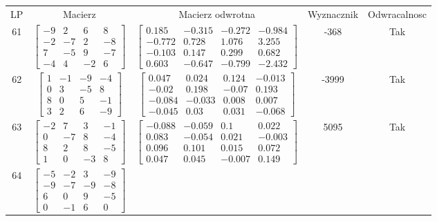 \documentclass[a4paper,12pt]{article}
\begin{document}
\bgroup {} \vspace{0.2in} \begin{tabular}{c c c c c}
LP & Macierz & Macierz odwrotna & Wyznacznik & Odwracalnosc\\
61
&
$\begin{bmatrix} -9 & 2 & 6 & 8 \\ -2 & -7 & 2 & -8 \\ 7 & -5 & 9 & -7 \\ -4 & 4 & -2 & 6 \end{bmatrix}$
&
$\begin{bmatrix} 0.185 & -0.315 & -0.272 & -0.984 \\ -0.772 & 0.728 & 1.076 & 3.255 \\ -0.103 & 0.147 & 0.299 & 0.682 \\ 0.603 & -0.647 & -0.799 & -2.432 \end{bmatrix}$
&
-368
&
Tak
\\
62
&
$\begin{bmatrix} 1 & -1 & -9 & -4 \\ 0 & 3 & -5 & 8 \\ 8 & 0 & 5 & -1 \\ 3 & 2 & 6 & -9 \end{bmatrix}$
&
$\begin{bmatrix} 0.047 & 0.024 & 0.124 & -0.013 \\ -0.02 & 0.198 & -0.07 & 0.193 \\ -0.084 & -0.033 & 0.008 & 0.007 \\ -0.045 & 0.03 & 0.031 & -0.068 \end{bmatrix}$
&
-3999
&
Tak
\\
63
&
$\begin{bmatrix} -2 & 7 & 3 & -1 \\ 0 & -7 & 8 & -4 \\ 8 & 2 & 8 & -5 \\ 1 & 0 & -3 & 8 \end{bmatrix}$
&
$\begin{bmatrix} -0.088 & -0.059 & 0.1 & 0.022 \\ 0.083 & -0.054 & 0.021 & -0.003 \\ 0.096 & 0.101 & 0.015 & 0.072 \\ 0.047 & 0.045 & -0.007 & 0.149 \end{bmatrix}$
&
5095
&
Tak
\\
64
&
$\begin{bmatrix} -5 & -2 & 3 & -9 \\ -9 & -7 & -9 & -8 \\ 6 & 0 & 9 & -5 \\ 0 & -1 & 6 & 0 \end{bmatrix}$

\end{tabular}
\end{document}
